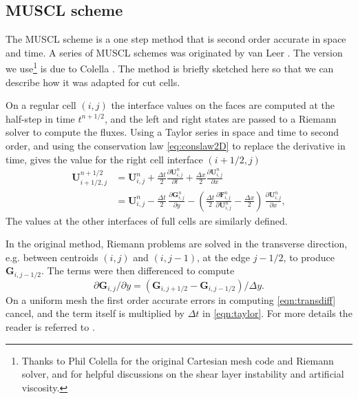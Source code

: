 \subsection{MUSCL scheme} \label{sec:muscl}
The MUSCL scheme is a one step method that is second order accurate in
space and time. A series of MUSCL schemes  was originated by van Leer 
\cite{vanleer:muscl}. The version we use\footnote{Thanks to Phil 
Colella for the original Cartesian mesh code and Riemann solver,  and for helpful discussions on the shear
layer instability and artificial viscosity.}
is due to Colella \cite{Colella:Unsplit}.
The method is briefly sketched here so that we can describe how it was
adapted for cut cells. 

On a regular cell $(i,j)$ the interface values on the 
faces are computed at the half-step in time $t^{n+1/2}$, and the left and right states
are passed to a Riemann
solver to compute the fluxes.
Using a Taylor series in space and time to second order,
and using the conservation law \eqref{eq:conslaw2D}  to replace the derivative in time, gives the value for the right cell
interface $(i+1/2,j)$ 
\begin{subequations}
\begin{align}
\label{eqn:taylor}
\mathbf{U}_{i+1/2,j}^{n+1/2}    
              &= \mathbf{U}_{i,j}^n +  
\frac{\Delta t}{2} \frac{\partial \mathbf{U}_{i,j}^n}{\partial t} + 
\frac{\Delta x}{2} \frac{\partial \mathbf{U}_{i,j}^n}{\partial x} \\[.08in]
              &= \mathbf{U}_{i,j}^n - \frac{\Delta t}{2} \, 
             \frac{\partial \mathbf{G}_{i,j}^n}{\partial y}  -
            \left( \frac{\Delta t}{2} 
            \frac{\partial \mathbf{F}_{i,j}^n}{\partial \mathbf{U}^n_{i,j}} -
             \frac{\Delta x}{2} \right) \,\frac{\partial \mathbf{U}_{i,j}^n}{\partial x}, 
\end{align}
\end{subequations}
The values at the other interfaces of full cells are similarly defined.


In the original method,
Riemann problems are solved in the transverse direction, e.g. between
centroids $(i,j)$ and $(i,j-1)$, at the edge $j-1/2$, to produce
$\mathbf{G}_{i,j-1/2}$. 
The terms were then differenced to compute 
\begin{equation}
\partial \mathbf{G}_{i,j}/\partial y =  (\mathbf{G}_{i,j+1/2} - \mathbf{G}_{i,j-1/2})/\Delta y .
\label{eqn:transdiff}
\end{equation}
On a uniform mesh 
the first order accurate errors in computing \eqref{eqn:transdiff} 
cancel, and the term itself is 
multiplied by $\Delta t$ in \eqref{eqn:taylor}.
For more details the reader is referred to \cite{Colella:Unsplit}.


